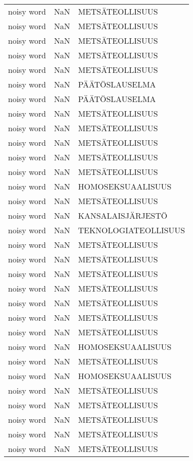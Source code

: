 \begin{tabular}{lll}
 noisy word &  NaN &       METSÄTEOLLISUUS \\
 noisy word &  NaN &       METSÄTEOLLISUUS \\
 noisy word &  NaN &       METSÄTEOLLISUUS \\
 noisy word &  NaN &       METSÄTEOLLISUUS \\
 noisy word &  NaN &       METSÄTEOLLISUUS \\
 noisy word &  NaN &        PÄÄTÖSLAUSELMA \\
 noisy word &  NaN &        PÄÄTÖSLAUSELMA \\
 noisy word &  NaN &       METSÄTEOLLISUUS \\
 noisy word &  NaN &       METSÄTEOLLISUUS \\
 noisy word &  NaN &       METSÄTEOLLISUUS \\
 noisy word &  NaN &       METSÄTEOLLISUUS \\
 noisy word &  NaN &       METSÄTEOLLISUUS \\
 noisy word &  NaN &     HOMOSEKSUAALISUUS \\
 noisy word &  NaN &       METSÄTEOLLISUUS \\
 noisy word &  NaN &     KANSALAISJÄRJESTÖ \\
 noisy word &  NaN &  TEKNOLOGIATEOLLISUUS \\
 noisy word &  NaN &       METSÄTEOLLISUUS \\
 noisy word &  NaN &       METSÄTEOLLISUUS \\
 noisy word &  NaN &       METSÄTEOLLISUUS \\
 noisy word &  NaN &       METSÄTEOLLISUUS \\
 noisy word &  NaN &       METSÄTEOLLISUUS \\
 noisy word &  NaN &       METSÄTEOLLISUUS \\
 noisy word &  NaN &       METSÄTEOLLISUUS \\
 noisy word &  NaN &     HOMOSEKSUAALISUUS \\
 noisy word &  NaN &       METSÄTEOLLISUUS \\
 noisy word &  NaN &     HOMOSEKSUAALISUUS \\
 noisy word &  NaN &       METSÄTEOLLISUUS \\
 noisy word &  NaN &       METSÄTEOLLISUUS \\
 noisy word &  NaN &       METSÄTEOLLISUUS \\
 noisy word &  NaN &       METSÄTEOLLISUUS \\
 noisy word &  NaN &       METSÄTEOLLISUUS \\

\end{tabular}

